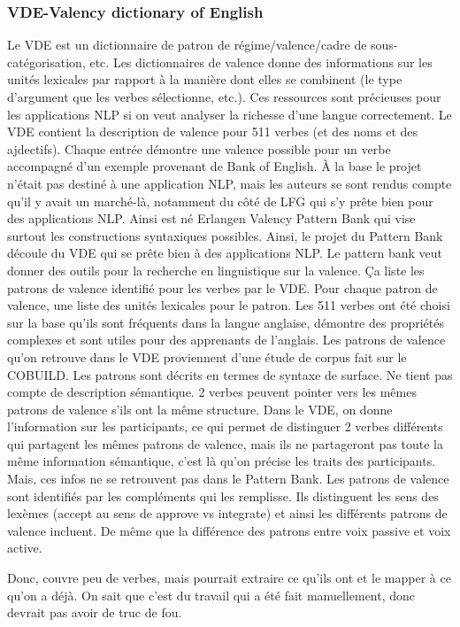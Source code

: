 \subsubsection{VDE-Valency dictionary of English}
Le VDE est un dictionnaire de patron de régime/valence/cadre de sous-catégorisation, etc.  Les dictionnaires de valence donne des informations sur les unités lexicales par rapport à la manière dont elles se combinent (le type d'argument que les verbes sélectionne, etc.). Ces ressources sont précieuses pour les applications NLP si on veut analyser la richesse d'une langue correctement. \citep{PROISL10.62}Le VDE contient la description de valence pour 511 verbes (et des noms et des ajdectifs). Chaque entrée démontre une valence possible pour un verbe accompagné d'un exemple provenant de Bank of English. À la base le projet n'était pas destiné à une application NLP, mais les auteurs se sont rendus compte qu'il y avait un marché-là, notamment du côté de LFG qui s'y prête bien pour des applications NLP. Ainsi est né Erlangen Valency Pattern Bank qui vise surtout les constructions syntaxiques possibles. Ainsi, le projet du Pattern Bank découle du VDE qui se prête bien à des applications NLP. Le pattern bank veut donner des outils pour la recherche en linguistique sur la valence. Ça liste les patrons de valence identifié pour les verbes par le VDE. Pour chaque patron de valence, une liste des unités lexicales pour le patron.  Les 511 verbes ont été choisi sur la base qu'ils sont fréquents dans la langue anglaise, démontre des propriétés complexes et sont utiles pour des apprenants de l'anglais. Les patrons de valence qu'on retrouve dans le VDE proviennent d'une étude de corpus fait sur le COBUILD. Les patrons sont décrits en termes de syntaxe de surface. Ne tient pas compte de description sémantique. 2 verbes peuvent pointer vers les mêmes patrons de valence s'ils ont la même structure. Dans le VDE, on donne l'information sur les participants, ce qui permet de distinguer 2 verbes différents qui partagent les mêmes patrons de valence, mais ils ne partageront pas toute la même information sémantique, c'est là qu'on précise les traits des participants. Mais, ces infos ne se retrouvent pas dans le Pattern Bank. Les patrons de valence sont identifiés par les compléments qui les remplisse. Ils distinguent les sens des lexèmes (accept au sens de approve vs integrate) et ainsi les différents patrons de valence incluent. De même que la différence des patrons entre voix passive et voix active. 

Donc, couvre peu de verbes, mais pourrait extraire ce qu'ils ont et le mapper à ce qu'on a déjà. On sait que c'est du travail qui a été fait manuellement, donc devrait pas avoir de truc de fou.

